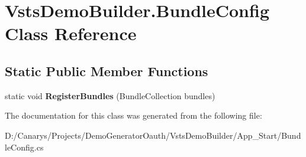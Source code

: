 \hypertarget{class_vsts_demo_builder_1_1_bundle_config}{}\section{Vsts\+Demo\+Builder.\+Bundle\+Config Class Reference}
\label{class_vsts_demo_builder_1_1_bundle_config}
\subsection*{Static Public Member Functions}
\begin{DoxyCompactItemize}
\item 
\mbox{\label{class_vsts_demo_builder_1_1_bundle_config_aa07a45768680a6710f679b0c8d88e902}} 
static void {\bfseries Register\+Bundles} (Bundle\+Collection bundles)
\end{DoxyCompactItemize}


The documentation for this class was generated from the following file\+:\begin{DoxyCompactItemize}
\item 
D\+:/\+Canarys/\+Projects/\+Demo\+Generator\+Oauth/\+Vsts\+Demo\+Builder/\+App\+\_\+\+Start/Bundle\+Config.\+cs\end{DoxyCompactItemize}
